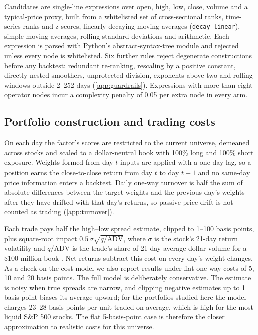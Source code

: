 \documentclass[preprint,12pt,authoryear]{elsarticle}
\begin{document}
Candidates are single-line expressions over open, high, low, close, volume and a typical-price proxy, built from a whitelisted set of cross-sectional ranks, time-series ranks and z-scores, linearly decaying moving averages (\texttt{decay\_linear}), simple moving averages, rolling standard deviations and arithmetic. Each expression is parsed with Python's abstract-syntax-tree module and rejected unless every node is whitelisted. Six further rules reject degenerate constructions before any backtest: redundant re-ranking, rescaling by a positive constant, directly nested smoothers, unprotected division, exponents above two and rolling windows outside 2--252 days (\ref{app:guardrails}). Expressions with more than eight operator nodes incur a complexity penalty of 0.05 per extra node in every arm.

\subsection{Portfolio construction and trading costs}\label{sec:costs}

On each day the factor's scores are restricted to the current universe, demeaned across stocks and scaled to a dollar-neutral book with 100\% long and 100\% short exposure. Weights formed from day-$t$ inputs are applied with a one-day lag, so a position earns the close-to-close return from day $t$ to day $t+1$ and no same-day price information enters a backtest. Daily one-way turnover is half the sum of absolute differences between the target weights and the previous day's weights after they have drifted with that day's returns, so passive price drift is not counted as trading (\ref{app:turnover}).

Each trade pays half the \citet{corwin2012} high--low spread estimate, clipped to 1--100 basis points, plus square-root impact $0.5\,\sigma\sqrt{q/\mathrm{ADV}}$, where $\sigma$ is the stock's 21-day return volatility and $q/\mathrm{ADV}$ is the trade's share of 21-day average dollar volume for a \$100 million book \citep{grinold2000}. Net returns subtract this cost on every day's weight changes. As a check on the cost model we also report results under flat one-way costs of 5, 10 and 20 basis points. The full model is deliberately conservative. The \citet{corwin2012} estimate is noisy when true spreads are narrow, and clipping negative estimates up to 1 basis point biases its average upward; for the portfolios studied here the model charges 23--28 basis points per unit traded on average, which is high for the most liquid S\&P 500 stocks. The flat 5-basis-point case is therefore the closer approximation to realistic costs for this universe.
\end{document}
